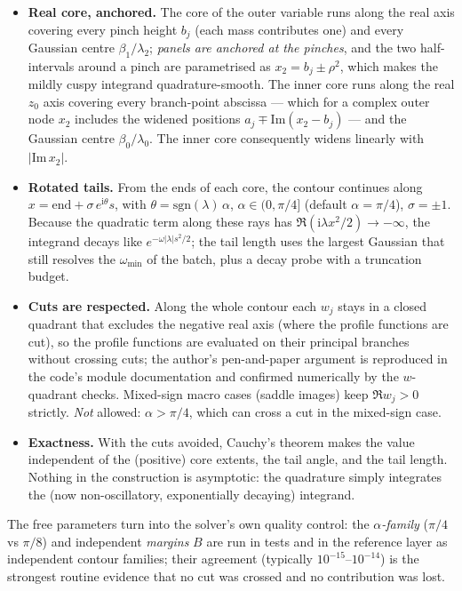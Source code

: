 \documentclass[11pt,a4paper]{article}
\newcommand{\ii}{\mathrm{i}}
\begin{document}
\begin{itemize}
\item \textbf{Real core, anchored.}  The core of the outer variable runs
  along the real axis covering every pinch height $b_j$ (each mass
  contributes one) and every Gaussian centre $\beta_1/\lambda_2$;
  \emph{panels are anchored at the pinches}, and the two half-intervals
  around a pinch are parametrised as $x_2 = b_j \pm \rho^2$, which makes the
  mildly cuspy integrand quadrature-smooth.  The inner core runs along the
  real $z_0$ axis covering every branch-point abscissa --- which for a
  complex outer node $x_2$ includes the widened positions
  $a_j \mp \mathrm{Im}(x_2-b_j)$ --- and the Gaussian centre
  $\beta_0/\lambda_0$.  The inner core consequently widens linearly with
  $|\mathrm{Im}\,x_2|$.
\item \textbf{Rotated tails.}  From the ends of each core, the contour
  continues along $x = \text{end} + \sigma\, e^{\ii\theta} s$, with
  $\theta = \mathrm{sgn}(\lambda)\,\alpha$, $\alpha \in (0,\pi/4]$
  (default $\alpha = \pi/4$), $\sigma = \pm1$.  Because the quadratic term
  along these rays has $\Re(\ii\lambda x^2/2) \to -\infty$, the integrand
  decays like $e^{-\omega|\lambda| s^2/2}$; the tail length uses the largest
  Gaussian that still resolves the $\omega_{\min}$ of the batch, plus a
  decay probe with a truncation budget.
\item \textbf{Cuts are respected.}  Along the whole contour each $w_j$
  stays in a closed quadrant that excludes the negative real axis (where
  the profile functions are cut), so the profile functions are evaluated on
  their principal branches without crossing cuts; the author's pen-and-paper
  argument is reproduced in the code's module documentation and confirmed
  numerically by the $w$-quadrant checks.  Mixed-sign macro cases (saddle
  images) keep $\Re w_j > 0$ strictly.  \emph{Not} allowed: $\alpha > \pi/4$,
  which can cross a cut in the mixed-sign case.
\item \textbf{Exactness.}  With the cuts avoided, Cauchy's theorem makes the
  value independent of the (positive) core extents, the tail angle, and the
  tail length.  Nothing in the construction is asymptotic: the quadrature
  simply integrates the (now non-oscillatory, exponentially decaying)
  integrand.
\end{itemize}

The free parameters turn into the solver's own quality control: the
\emph{$\alpha$-family} ($\pi/4$ vs $\pi/8$) and independent \emph{margins}
$B$ are run in tests and in the reference layer as independent contour
families; their agreement (typically $10^{-15}$--$10^{-14}$) is the
strongest routine evidence that no cut was crossed and no contribution was
lost.
\end{document}
